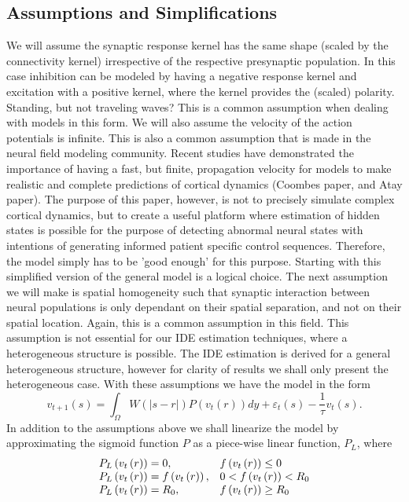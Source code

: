 \documentclass[onecolumn,draftcls]{IEEEtran}
\begin{document}
\subsection{Assumptions and Simplifications}
We will assume the synaptic response kernel has the same shape (scaled by the connectivity kernel) irrespective of the respective presynaptic population. In this case inhibition can be modeled by having a negative response kernel and excitation with a positive kernel, where the kernel provides the (scaled) polarity. Standing, but not traveling waves? This is a common assumption when dealing with models in this form. We will also assume the velocity of the action potentials is infinite. This is also a common assumption that is made in the neural field modeling community. Recent studies have demonstrated the importance of having a fast, but finite, propagation velocity for models to make realistic and complete predictions of cortical dynamics (Coombes paper, and Atay paper). The purpose of this paper, however, is not to precisely simulate complex cortical dynamics, but to create a useful platform where estimation of hidden states is possible for the purpose of detecting abnormal neural states with intentions of generating informed patient specific control sequences. Therefore, the model simply has to be 'good enough' for this purpose. Starting with this simplified version of the general model is a logical choice. The next assumption we will make is spatial homogeneity such that synaptic interaction between neural populations is only dependant on their spatial separation, and not on their spatial location. Again, this is a common assumption in this field.  This assumption is not essential for our IDE estimation techniques, where a heterogeneous structure is possible. The IDE estimation is derived for a general heterogeneous structure, however for clarity of results we shall only present the heterogeneous case. With these assumptions we have the model in the form
\begin{equation}\label{Eq10}
{v_{t + 1}}\left( s \right) = \int_\Omega  {W\left( {\left| {s - r} \right|} \right)P\left( {{v_t}\left( r \right)} \right)dy}  + {\varepsilon _t}\left( s \right) - \frac{1}{\tau }{v_t}\left( s \right).
\end{equation}
In addition to the assumptions above we shall linearize the model by approximating the sigmoid function $P$ as a piece-wise linear function, $P_{L}$, where
\begin{equation}\label{Eq11}
\begin{array}{*{20}{c}}
   {{P_{L}}\left( {{v_t}\left( r \right)} \right) = 0,} \hfill & {f\left( {{v_t}\left( r \right)} \right) \le 0} \hfill  \\
   {{P_{L}}\left( {{v_t}\left( r \right)} \right) = f\left( {{v_t}\left( r \right)} \right),} \hfill & {0 < f\left( {{v_t}\left( r \right)} \right) < {R_0}} \hfill  \\
   {{P_{L}}\left( {{v_t}\left( r \right)} \right) = {R_0},} \hfill & {f\left( {{v_t}\left( r \right)} \right) \ge {R_0}} \hfill  \\
\end{array}
\end{equation}
\end{document}
